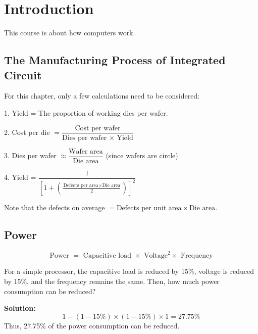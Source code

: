 \chapter{Introduction}

This course is about how computers work. 

\section{The Manufacturing Process of Integrated Circuit}

For this chapter, only a few calculations need to be considered:

1. Yield = The proportion of working dies per wafer. 

2. Cost per die \(= \dfrac{\text{Cost per wafer}}{\text{Dies per wafer }\times\text{ Yield}}\) 

3. Dies per wafer \(\approx \dfrac{\text{Wafer area}}{\text{Die area}}\) (since wafers are circle)

4. Yield = \(\dfrac{1}{\left[1 + (\frac{\text{Defects per area} \times \text{Die area}}{2})\right]^2}\) 

\begin{remark}
  Note that the defects on average \(= \text{Defects per unit area} \times \text{Die area}\).
\end{remark}

\section{Power}
\[
  \text{Power } = \text{ Capacitive load } \times \text{ Voltage}^2 \times \text{ Frequency}
\]

\begin{eg}
  For a simple processor, the capacitive load is reduced by 15\%, voltage is reduced by 15\%, and the frequency remains the same. Then, how much power consumption can be reduced? 

  \textbf{Solution:} 
  \[
    1 - (1 - 15\%) \times (1 - 15\%) \times 1 = 27.75\%
  \]
  Thus, 27.75\% of the power consumption can be reduced. 
\end{eg}